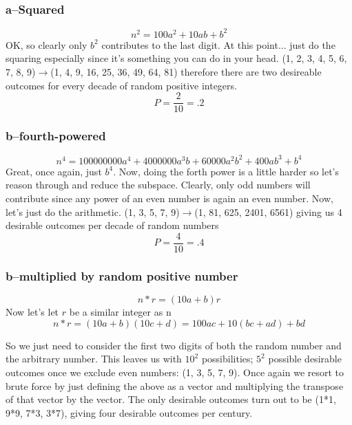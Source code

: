 \subsubsection{a--Squared}
\begin{equation}
	n^2=100a^2+10ab+b^2
\end{equation}
OK, so clearly only $b^2$ contributes to the last digit.  At this point... just do the squaring especially since it's something you can do in your head. (1, 2, 3, 4, 5, 6, 7, 8, 9)$\rightarrow$(1, 4, 9, 16, 25, 36, 49, 64, 81) therefore there are two desireable outcomes for every decade of random positive integers.
\begin{equation}
	P=\frac{2}{10}=.2
\label{answer1.10a}
\end{equation}

\subsubsection{b--fourth-powered}
\begin{equation}
	n^4=100000000 a^4+4000000 a^3 b+60000 a^2 b^2+400 a b^3+b^4
\end{equation}
Great, once again, just $b^4$.  Now, doing the forth power is a little harder so let's reason through and reduce the subspace.  Clearly, only odd numbers will contribute since any power of an even number is again an even number. Now, let's just do the arithmetic. (1, 3, 5, 7, 9)$\rightarrow$(1, 81, 625, 2401, 6561) giving us 4 desirable outcomes per decade of random numbers
\begin{equation}
	P=\frac{4}{10}=.4
\label{answer1.10a}
\end{equation}

\subsubsection{b--multiplied by random positive number}
\begin{equation}
	n*r=(10a+b)r
\end{equation}
Now let's let $r$ be a similar integer as n
\begin{equation}
	n*r=(10a+b)(10c+d)=100ac+10(bc+ad)+bd
\end{equation}

So we just need to consider the first two digits of both the random number and the arbitrary number.  This leaves us with $10^2$ possibilities; $5^2$ possible desirable outcomes once we exclude even numbers: (1, 3, 5, 7, 9).  Once again we resort to brute force by just defining the above as a vector and multiplying the transpose of that vector by the vector.  The only desirable outcomes turn out to be (1*1, 9*9, 7*3, 3*7), giving four desirable outcomes per century.

